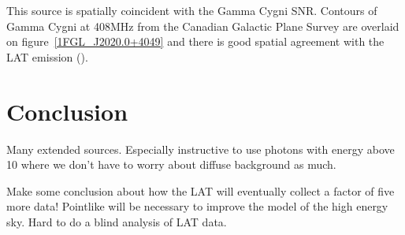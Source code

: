 \documentclass[12pt,preprint]{aastex}
\newcommand{\gev}{\text{GeV}\xspace}
\begin{document}
This source is spatially coincident with the Gamma Cygni SNR.  Contours of
Gamma Cygni at 408MHz from the Canadian Galactic Plane Survey are overlaid
on figure~\ref{1FGL_J2020.0+4049} and there is good spatial agreement
with the LAT emission (\cite{canadian_galactic_plane_survey}).


\section{Conclusion}


Many extended sources. Especially instructive to
use photons with energy above 10 \gev where we don't have
to worry about diffuse background as much.

Make some conclusion about how the LAT will eventually collect a factor
of five more data! Pointlike will be necessary to improve the model of the
high energy sky. Hard to do a blind analysis of LAT data.




\appendix
\end{document}
